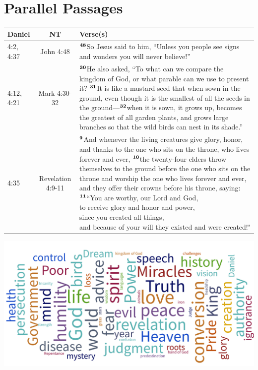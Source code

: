 \documentclass[12pt,a4paper,final]{article}
\renewcommand{\textsuperscript}[1]{\ensuremath{^{\textbf{\scriptsize #1}}}}
\begin{document}
\newpage
\section*{Parallel Passages}
\begin{tabularx}{\linewidth}{lcX}
\hline 
\textbf{Daniel} & \textbf{NT} & \textbf{Verse(s)} \\ 
\hline 
4:2, 4:37 & John 4:48 & \textsuperscript{48}So Jesus said to him, “Unless you people see signs and wonders you will never believe!” \\ 
\hline 
4:12, 4:21 & Mark 4:30-32 & \textsuperscript{30}He also asked, “To what can we compare the kingdom of God, or what parable can we use to present it? \textsuperscript{31}It is like a mustard seed that when sown in the ground, even though it is the smallest of all the seeds in the ground—\textsuperscript{32}when it is sown, it grows up, becomes the greatest of all garden plants, and grows large branches so that the wild birds can nest in its shade.”  \\ 
\hline 
4:35 & Revelation 4:9-11 & \makecell[Xt]{\textsuperscript{9}And whenever the living creatures give glory, honor, and thanks to the one who sits on the throne, who lives forever and ever, \textsuperscript{10}the twenty-four elders throw themselves to the ground before the one who sits on the throne and worship the one who lives forever and ever, and they offer their crowns before his throne, saying: \\
    \textsuperscript{11}“You are worthy, our Lord and God, \\
    to receive glory and honor and power, \\
    since you created all things, \\
    and because of your will they existed and were created!" \\ 
}\\
\hline 
\end{tabularx}

\includegraphics[scale=1]{wordcloud.png} 
\end{document}
